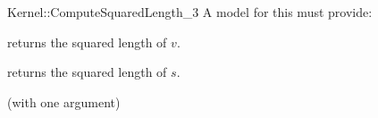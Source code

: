 \begin{ccRefFunctionObjectConcept}{Kernel::ComputeSquaredLength_3}
A model for this must provide:


       {returns the squared length of $v$. }

       {returns the squared length of $s$. }

\ccRefines
{} (with one argument)

\ccSeeAlso
{} \\
 \\

\end{ccRefFunctionObjectConcept}
